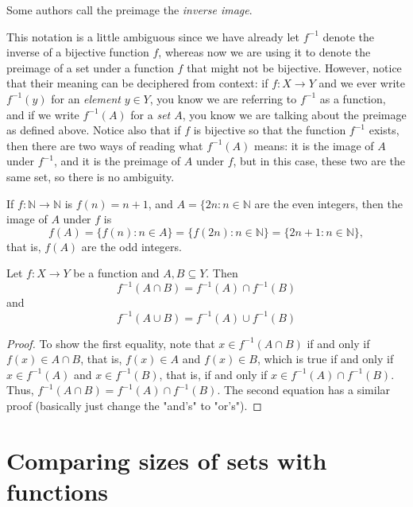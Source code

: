 \documentclass[11pt,dvipsnames]{book}
\numberwithin{figure}{section} %
\numberwithin{table}{section} %
\begin{document}
Some authors call the preimage the \emph{inverse image}.

This notation is a little ambiguous since we have already let $f^{-1}$ denote the inverse of a bijective function $f$, whereas now we are using it to denote the preimage of a set under a function $f$ that might not be bijective. However, notice that their meaning can be deciphered from context: if $f\colon X\rightarrow Y$ and we ever write $f^{-1}(y)$ for an {\it element} $y\in Y$, you know we are referring to $f^{-1}$ as a function, and if we write $f^{-1}(A)$ for a {\it set $A$}, you know we are talking about the preimage as defined above. Notice also that if $f$ is bijective so that the function $f^{-1}$ exists, then there are two ways of reading what $f^{-1}(A)$ means: it is the image of $A$ under $f^{-1}$, and it is the preimage of $A$ under $f$, but in this case, these two are the same set, so there is no ambiguity.

\begin{example}
If  $f\colon\mathbb{N}\rightarrow \mathbb{N}$ is $f(n)=n+1$, and $A=\{2n:n\in\mathbb{N}$ are the even integers, then the image of $A$ under $f$ is
\[
f(A)=\{f(n):n\in A\} = \{f(2n): n\in\mathbb{N}\} = \{2n+1:n\in\mathbb{N}\},\]
that is, $f(A)$ are the odd integers.
\end{example}

\begin{theorem}
Let $f:X\rightarrow Y$ be a function and $A,B\subseteq Y$. Then
\[
f^{-1}(A\cap B)=f^{-1}(A)\cap f^{-1}(B)
\]
and
\[
f^{-1}(A\cup B)=f^{-1}(A)\cup f^{-1}(B)
\]
\end{theorem}

\begin{proof}
To show the first equality, note that $x\in f^{-1}(A\cap B)$ if and only if $f(x)\in A\cap B$, that is, $f(x)\in A$ and $f(x)\in B$, which is true if and only if $x\in f^{-1}(A)$ and $x\in f^{-1}(B)$, that is, if and only if $x\in f^{-1}(A)\cap f^{-1}(B)$. Thus, $f^{-1}(A\cap B)=f^{-1}(A)\cap f^{-1}(B)$. The second equation has a similar proof (basically just change the "and's" to "or's").
\end{proof}

\section{Comparing sizes of sets with functions}

\end{document}
